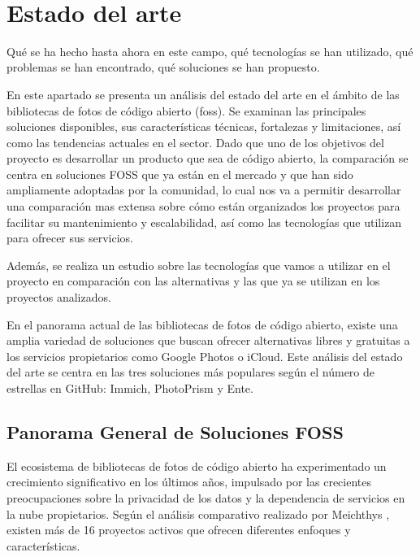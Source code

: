 \newpage
~
\newpage
\section{Estado del arte}
Qué se ha hecho hasta ahora en este campo, qué tecnologías se han utilizado, qué problemas se han encontrado, qué soluciones se han propuesto.

%
%


En este apartado se presenta un análisis del estado del arte en el ámbito de las bibliotecas de fotos de código abierto (\acrshort{foss}).
Se examinan las principales soluciones disponibles, sus características técnicas, fortalezas y limitaciones, así como las tendencias actuales en el sector.
Dado que uno de los objetivos del proyecto es desarrollar un producto que sea de código abierto, la comparación se centra en soluciones FOSS que ya están en el mercado y que han sido ampliamente adoptadas por la comunidad, lo cual nos va a permitir desarrollar una comparación mas extensa sobre cómo están organizados los proyectos para facilitar su mantenimiento y escalabilidad, así como las tecnologías que utilizan para ofrecer sus servicios.

Además, se realiza un estudio sobre las tecnologías que vamos a utilizar en el proyecto en comparación con las alternativas y las que ya se utilizan en los proyectos analizados.

En el panorama actual de las bibliotecas de fotos de código abierto, existe una amplia variedad de soluciones que buscan ofrecer alternativas libres y gratuitas a los servicios propietarios como Google Photos o iCloud. Este análisis del estado del arte se centra en las tres soluciones más populares según el número de estrellas en GitHub: Immich, PhotoPrism y Ente.

\subsection{Panorama General de Soluciones FOSS}

El ecosistema de bibliotecas de fotos de código abierto ha experimentado un crecimiento significativo en los últimos años, impulsado por las crecientes preocupaciones sobre la privacidad de los datos y la dependencia de servicios en la nube propietarios. Según el análisis comparativo realizado por Meichthys \cite{meichthys2024}, existen más de 16 proyectos activos que ofrecen diferentes enfoques y características.

